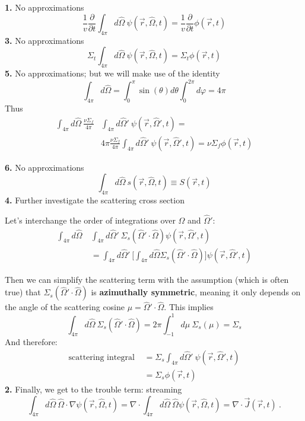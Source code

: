 \documentclass[12pt]{article}
\newcommand{\vOmega}{\ensuremath{\hat{\Omega}}}
\begin{document}
\textbf{1.} No approximations
\begin{equation}
\frac{1}{v}\frac{\partial}{\partial t} \int_{4\pi} d\vOmega \: \psi(\vec{r}, \vOmega, t) = \boxed{\frac{1}{v}\frac{\partial}{\partial t}\phi(\vec{r}, t)}\nonumber
\end{equation}
\textbf{3.} No approximations
\begin{equation}
\Sigma_t \int_{4\pi} d\vOmega \:\psi(\vec{r}, \vOmega, t) = \boxed{\Sigma_t \phi(\vec{r}, t)} \nonumber 
\end{equation}
\textbf{5.} No approximations; but we will make use of the identity
\[\int_{4\pi} d\vOmega = \int_0^{\pi} \sin(\theta) d\theta \int_0^{2\pi} d\varphi = 4\pi \]
Thus
\begin{align*}
\int_{4\pi} d\vOmega\: \frac{\nu \Sigma_f}{4\pi} &\int_{4\pi} d\vOmega' \:\psi(\vec{r},\vOmega', t) = \\
& 4\pi \frac{\nu \Sigma_f}{4\pi} \int_{4\pi} d\vOmega'\: \psi(\vec{r},\vOmega', t) = \boxed{\nu \Sigma_f \phi(\vec{r}, t)}
\end{align*}

\textbf{6.} No approximations
\begin{equation}
\int_{4\pi} d\vOmega \:s(\vec{r}, \vOmega, t) \equiv \boxed{S(\vec{r}, t)} \nonumber
\end{equation}
\textbf{4.} Further investigate the scattering cross section

Let's interchange the order of integrations over $\vOmega$ and $\vOmega'$:
%
\begin{align*}
\int_{4\pi} d\vOmega\: &\int_{4\pi} d\vOmega'\: \Sigma_s(\vOmega' \cdot \vOmega) \psi(\vec{r}, \vOmega', t)\\
%
&= \int_{4\pi} d\vOmega'\: \bigl[ \int_{4\pi} d\vOmega \Sigma_s(\vOmega' \cdot \vOmega)\bigr] \psi(\vec{r}, \vOmega', t)
\end{align*}

Then we can simplify the scattering term with the assumption (which is often true) that $\Sigma_s(\vOmega' \cdot \vOmega)$ is \textbf{azimuthally symmetric}, meaning it only depends on the angle of the scattering cosine $\mu =\vOmega' \cdot \vOmega$.  This implies
\[\int_{4\pi} d\vOmega \:\Sigma_s(\vOmega' \cdot \vOmega) = 2\pi \int_{-1}^{1} d\mu\: \Sigma_s(\mu) = \Sigma_s\]
%
And therefore:
%
\begin{align*}
\text{scattering integral }&= \Sigma_s \int_{4\pi} d\vOmega'\: \psi(\vec{r}, \vOmega', t) \\
%
&= \boxed{\Sigma_s \phi(\vec{r}, t)}
\end{align*}
\textbf{2.} Finally, we get to the trouble term: streaming
%
\[\int_{4\pi} d\vOmega \:\vOmega \cdot \nabla \psi(\vec{r}, \vOmega, t) = \nabla \cdot \int_{4\pi} d\vOmega \:\vOmega \psi(\vec{r}, \vOmega, t) = \nabla \cdot \vec{J}(\vec{r}, t)\:. \]
\end{document}
